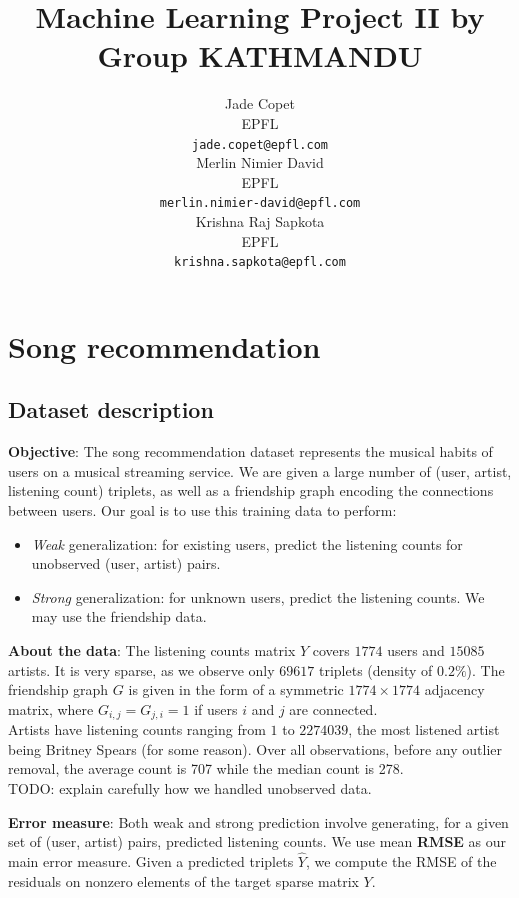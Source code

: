 \documentclass{article}
\title{Machine Learning Project II by Group KATHMANDU}
\author{
  Jade Copet\\
  EPFL \\
  \texttt{jade.copet@epfl.com} \\
  \And
  Merlin Nimier David\\
  EPFL \\
  \texttt{merlin.nimier-david@epfl.com} \\
  \And
  Krishna Raj Sapkota\\
  EPFL \\
  \texttt{krishna.sapkota@epfl.com} \\
}
\begin{document}
\maketitle



\begin{abstract}
\end{abstract}



\section{Song recommendation}

  \subsection{Dataset description}
  \textbf{Objective}: The song recommendation dataset represents the musical habits of users on a musical streaming service. We are given a large number of (user, artist, listening count) triplets, as well as a friendship graph encoding the connections between users. Our goal is to use this training data to perform:

  \begin{itemize}
    \item \textit{Weak} generalization: for existing users, predict the listening counts for unobserved (user, artist) pairs.
    \item \textit{Strong} generalization: for unknown users, predict the listening counts. We may use the friendship data.
  \end{itemize}

  \textbf{About the data}: The listening counts matrix $Y$ covers $1774$ users and $15085$ artists. It is very sparse, as we observe only $69617$ triplets (density of $0.2\%$). The friendship graph $G$ is given in the form of a symmetric $1774 \times 1774$ adjacency matrix, where $G_{i, j} = G_{j, i} = 1$ if users $i$ and $j$ are connected.\\

  Artists have listening counts ranging from $1$ to $2274039$, the most listened artist being Britney Spears (for some reason). Over all observations, before any outlier removal, the average count is 707 while the median count is 278.\\

  TODO: explain carefully how we handled unobserved data.

  \textbf{Error measure}: Both weak and strong prediction involve generating, for a given set of (user, artist) pairs, predicted listening counts. We use mean \textbf{RMSE} as our main error measure. Given a predicted triplets $\hat{Y}$, we compute the RMSE of the residuals on nonzero elements of the target sparse matrix $Y$.\\
\end{document}
